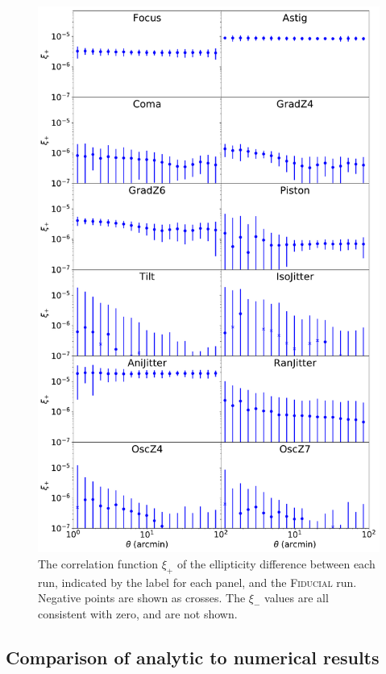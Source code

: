 \documentclass[usenatbib]{mnras}
\begin{document}
\begin{figure}
\begin{center}
\includegraphics[width=\columnwidth]{figures/2pt_corrs.pdf}
\end{center}
\caption[]{ The correlation function $\xi_+$ of the ellipticity difference between each run, indicated by the label for each panel, and the \textsc{Fiducial} run. Negative points are shown as crosses. The $\xi_-$ values are all consistent with zero, and are not shown.
\label{fig:f2pt_corrs}}
\end{figure}

\subsection{Comparison of analytic to numerical results}
\end{document}
